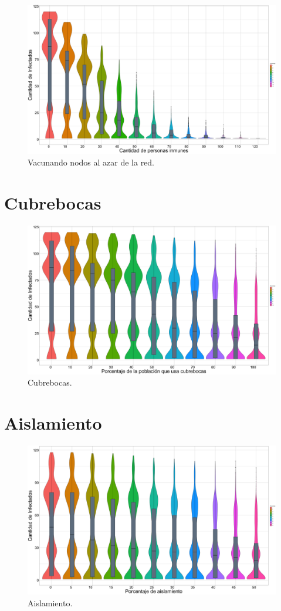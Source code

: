 \begin{figure}
    \centering
    \includegraphics[scale=0.18]{Tesis/img/random.png}
    \caption{Vacunando nodos al azar de la red.}
    \label{fig:random}
\end{figure}

\section{Cubrebocas}



\begin{figure}
    \centering
    \includegraphics[scale=0.18]{Tesis/img/face-mask.png}
    \caption{Cubrebocas.}
    \label{fig:face-mask}
\end{figure}

\section{Aislamiento}

\begin{figure}
    \centering
    \includegraphics[scale=0.18]{Tesis/img/isolation.png}
    \caption{Aislamiento.}
    \label{fig:isolation}
\end{figure}
